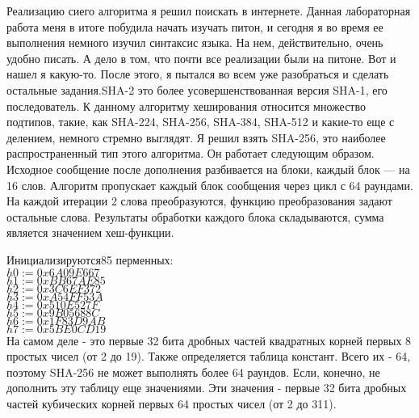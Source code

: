 \documentclass[12pt]{article}
\begin{document}
Реализацию сиего алгоритма я решил поискать в интернете. Данная лабораторная работа меня в итоге побудила начать изучать питон, и сегодня я во время ее выполнения немного изучил синтаксис языка. На нем, действительно, очень удобно писать. А дело в том, что почти все реализации были на питоне. Вот и нашел я какую-то. После этого, я пытался во всем уже разобраться и сделать остальные задания.SHA-2 это более усовершенствованная версия SHA-1, его последователь. К данному алгоритму хеширования относится множество подтипов, такие, как SHA-224, SHA-256, SHA-384, SHA-512 и какие-то еще с делением, немного стремно выглядят. Я решил взять SHA-256, это наиболее распространенный тип этого алгоритма. Он работает следующим образом. Исходное сообщение после дополнения разбивается на блоки, каждый блок — на 16 слов. Алгоритм пропускает каждый блок сообщения через цикл с 64 раундами. На каждой итерации 2 слова преобразуются, функцию преобразования задают остальные слова. Результаты обработки каждого блока складываются, сумма является значением хеш-функции.

Инициализируются85 перменных:\\
$h0 := 0x6A09E667$ \\
$h1 := 0xBB67AE85$ \\
$h2 := 0x3C6EF372$ \\
$h3 := 0xA54FF53A$ \\
$h4 := 0x510E527F$ \\
$h5 := 0x9B05688C$ \\
$h6 := 0x1F83D9AB$ \\
$h7 := 0x5BE0CD19$ \\

На самом деле - это первые 32 бита дробных частей квадратных корней первых 8 простых чисел (от 2 до 19).
Также определяется таблица констант. Всего их - 64, поэтому SHA-256 не может выполнять более 64 раундов. Если, конечно, не дополнить эту таблицу еще значениями. Эти значения - первые 32 бита дробных частей кубических корней первых 64 простых чисел (от 2 до 311).
\end{document}
